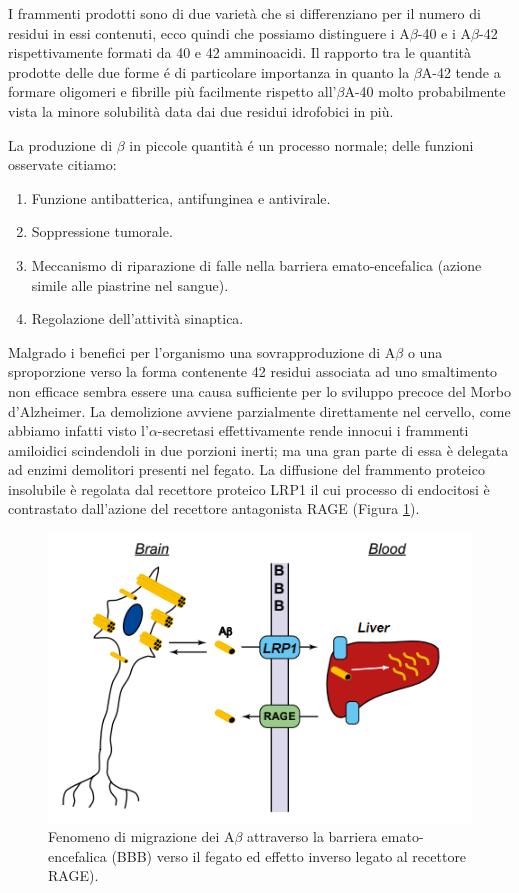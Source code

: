 \documentclass[a4paper, 12pt]{article}
\begin{document}
I frammenti prodotti sono di due varietà che si differenziano per il numero di residui in essi contenuti, ecco quindi che possiamo distinguere i A$\beta$-40 e i A$\beta$-42 rispettivamente formati da 40 e 42 amminoacidi. Il rapporto tra le quantità prodotte delle due forme é di particolare importanza in quanto la $\beta$A-42 tende a formare oligomeri e fibrille più facilmente rispetto all’$\beta$A-40 molto probabilmente vista la minore solubilità data dai due residui idrofobici in più.\cite{kepp_bioinorganic_2012, irvine_protein_2008}

La produzione di $\beta$ in piccole quantità é un processo normale; delle funzioni osservate citiamo: \cite{brothers_physiological_2018}

\begin{enumerate}
	\item Funzione antibatterica, antifunginea e antivirale.
	\item Soppressione tumorale.
	\item Meccanismo di riparazione di falle nella barriera emato-encefalica (azione simile alle piastrine nel sangue).
	\item Regolazione dell'attività sinaptica.
\end{enumerate}

Malgrado i benefici per l'organismo una sovrapproduzione di A$\beta$ o una sproporzione verso la forma contenente 42 residui associata ad uno smaltimento non efficace sembra essere una causa sufficiente per lo sviluppo precoce del Morbo d’Alzheimer. \cite{irvine_protein_2008}
La demolizione avviene parzialmente direttamente nel cervello, come abbiamo infatti visto l'$\alpha$-secretasi effettivamente rende innocui i frammenti amiloidici scindendoli in due porzioni inerti; ma una gran parte di essa è delegata ad enzimi demolitori presenti nel fegato. La diffusione del frammento proteico insolubile è regolata dal recettore proteico LRP1 il cui processo di endocitosi è contrastato dall'azione del recettore antagonista RAGE (Figura \ref{fig:bbb}).\cite{lillis_beyond_2005, dries_extracting_2012}

\begin{figure}[H]
	\centering
	\includegraphics[width=.8\linewidth]{immagini/bbb.png}
	\caption{Fenomeno di migrazione dei A$\beta$ attraverso la barriera emato-encefalica (BBB) verso il fegato ed effetto inverso legato al recettore RAGE).}
	\label{fig:bbb}
\end{figure}
\end{document}
